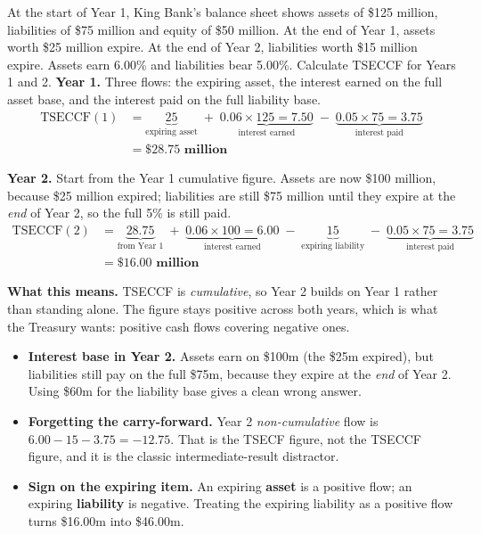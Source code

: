 \begin{lrexbox}
At the start of Year 1, King Bank's balance sheet shows assets of \$125 million, liabilities of \$75 million and equity of \$50 million. At the end of Year 1, assets worth \$25 million expire. At the end of Year 2, liabilities worth \$15 million expire. Assets earn 6.00\% and liabilities bear 5.00\%. Calculate TSECCF for Years 1 and 2.
\tcblower
\textbf{Year 1.} Three flows: the expiring asset, the interest earned on the full asset base, and the interest paid on the full liability base.
\begin{align*}
\text{TSECCF}(1) &= \underbrace{25}_{\text{expiring asset}} \;+\; \underbrace{0.06 \times 125 = 7.50}_{\text{interest earned}} \;-\; \underbrace{0.05 \times 75 = 3.75}_{\text{interest paid}} \\
&= \mathbf{\$28.75\text{ million}}
\end{align*}

\textbf{Year 2.} Start from the Year 1 cumulative figure. Assets are now \$100 million, because \$25 million expired; liabilities are still \$75 million until they expire at the \emph{end} of Year 2, so the full 5\% is still paid.
\begin{align*}
\text{TSECCF}(2) &= \underbrace{28.75}_{\text{from Year 1}} \;+\; \underbrace{0.06 \times 100 = 6.00}_{\text{interest earned}} \;-\; \underbrace{15}_{\text{expiring liability}} \;-\; \underbrace{0.05 \times 75 = 3.75}_{\text{interest paid}} \\
&= \mathbf{\$16.00\text{ million}}
\end{align*}

\textbf{What this means.} TSECCF is \emph{cumulative}, so Year 2 builds on Year 1 rather than standing alone. The figure stays positive across both years, which is what the Treasury wants: positive cash flows covering negative ones.
\end{lrexbox}

\begin{lrtrapbox}
\begin{itemize}
\item \textbf{Interest base in Year 2.} Assets earn on \$100m (the \$25m expired), but liabilities still pay on the full \$75m, because they expire at the \emph{end} of Year 2. Using \$60m for the liability base gives a clean wrong answer.
\item \textbf{Forgetting the carry-forward.} Year 2 \emph{non-cumulative} flow is $6.00 - 15 - 3.75 = -12.75$. That is the TSECF figure, not the TSECCF figure, and it is the classic intermediate-result distractor.
\item \textbf{Sign on the expiring item.} An expiring \textbf{asset} is a positive flow; an expiring \textbf{liability} is negative. Treating the expiring liability as a positive flow turns \$16.00m into \$46.00m.
\end{itemize}
\end{lrtrapbox}

